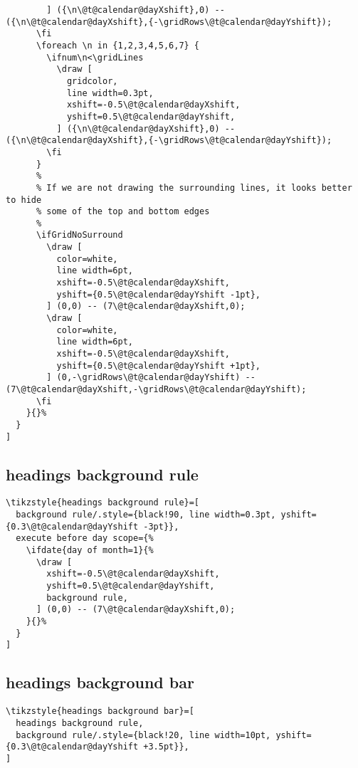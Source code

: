 \documentclass[11pt,oneside]{memoir-article}
\begin{document}
\begin{verbatim}
        ] ({\n\@t@calendar@dayXshift},0) -- ({\n\@t@calendar@dayXshift},{-\gridRows\@t@calendar@dayYshift});
      \fi
      \foreach \n in {1,2,3,4,5,6,7} {
        \ifnum\n<\gridLines
          \draw [
            gridcolor,
            line width=0.3pt,
            xshift=-0.5\@t@calendar@dayXshift,
            yshift=0.5\@t@calendar@dayYshift,
          ] ({\n\@t@calendar@dayXshift},0) -- ({\n\@t@calendar@dayXshift},{-\gridRows\@t@calendar@dayYshift});
        \fi
      }
      %
      % If we are not drawing the surrounding lines, it looks better to hide
      % some of the top and bottom edges
      %
      \ifGridNoSurround
        \draw [
          color=white,
          line width=6pt,
          xshift=-0.5\@t@calendar@dayXshift,
          yshift={0.5\@t@calendar@dayYshift -1pt},
        ] (0,0) -- (7\@t@calendar@dayXshift,0);
        \draw [
          color=white,
          line width=6pt,
          xshift=-0.5\@t@calendar@dayXshift,
          yshift={0.5\@t@calendar@dayYshift +1pt},
        ] (0,-\gridRows\@t@calendar@dayYshift) -- (7\@t@calendar@dayXshift,-\gridRows\@t@calendar@dayYshift);
      \fi
    }{}%
  }
]
\end{verbatim}

\subsection{headings background rule}
\label{sec:org4ba160c}

\begin{verbatim}
\tikzstyle{headings background rule}=[
  background rule/.style={black!90, line width=0.3pt, yshift={0.3\@t@calendar@dayYshift -3pt}},
  execute before day scope={%
    \ifdate{day of month=1}{%
      \draw [
        xshift=-0.5\@t@calendar@dayXshift,
        yshift=0.5\@t@calendar@dayYshift,
        background rule,
      ] (0,0) -- (7\@t@calendar@dayXshift,0);
    }{}%
  }
]
\end{verbatim}

\subsection{headings background bar}
\label{sec:org20ae9c5}

\begin{verbatim}
\tikzstyle{headings background bar}=[
  headings background rule,
  background rule/.style={black!20, line width=10pt, yshift={0.3\@t@calendar@dayYshift +3.5pt}},
]
\end{verbatim}
\end{document}
